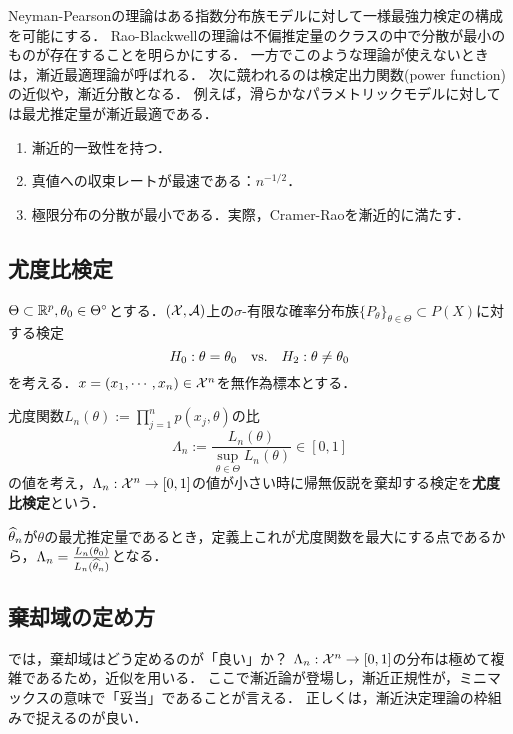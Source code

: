 \documentclass[uplatex,dvipdfmx]{jsreport}
\begin{document}
Neyman-Pearsonの理論はある指数分布族モデルに対して一様最強力検定の構成を可能にする．
Rao-Blackwellの理論は不偏推定量のクラスの中で分散が最小のものが存在することを明らかにする．
一方でこのような理論が使えないときは，漸近最適理論が呼ばれる．
次に競われるのは検定出力関数(power function)の近似や，漸近分散となる．
例えば，滑らかなパラメトリックモデルに対しては最尤推定量が漸近最適である．
\begin{enumerate}
    \item 漸近的一致性を持つ．
    \item 真値への収束レートが最速である：$n^{-1/2}$．
    \item 極限分布の分散が最小である．実際，Cramer-Raoを漸近的に満たす．
\end{enumerate}

\subsection{尤度比検定}

\begin{notation}
    $\Theta\subset\mathbb{R}^p,\theta_0\in\Theta^\circ$とする．$(\mathcal{X},\mathcal{A})$上の$\sigma$-有限な確率分布族$\{P_\theta\}_{\theta\in\Theta}\subset P(X)$に対する検定
    \[H_0:\theta=\theta_0\quad\mathrm{vs.}\quad H_2:\theta\ne\theta_0\]
    を考える．$x=(x_1,\cdots,x_n)\in\mathcal{X}^n$を無作為標本とする．
\end{notation}

\begin{definition}
    尤度関数$L_n(\theta):=\prod^n_{j=1}p(x_j,\theta)$の比
    \[\Lambda_n:=\frac{L_n(\theta)}{\sup_{\theta\in\Theta}L_n(\theta)}\in[0,1]\]
    の値を考え，$\Lambda_n:\mathcal{X}^n\to[0,1]$の値が小さい時に帰無仮説を棄却する検定を\textbf{尤度比検定}という．
\end{definition}
\begin{remark}
    $\widehat{\theta}_n$が$\theta$の最尤推定量であるとき，定義上これが尤度関数を最大にする点であるから，$\Lambda_n=\frac{L_n(\theta_0)}{L_n(\widehat{\theta}_n)}$となる．
\end{remark}

\subsection{棄却域の定め方}

\begin{tcolorbox}[colframe=ForestGreen, colback=ForestGreen!10!white,breakable,colbacktitle=ForestGreen!40!white,coltitle=black,fonttitle=\bfseries\sffamily,
title=]
    では，棄却域はどう定めるのが「良い」か？
    $\Lambda_n:\mathcal{X}^n\to[0,1]$の分布は極めて複雑であるため，近似を用いる．
    ここで漸近論が登場し，漸近正規性が，ミニマックスの意味で「妥当」であることが言える．
    正しくは，漸近決定理論の枠組みで捉えるのが良い．
\end{tcolorbox}
\end{document}
